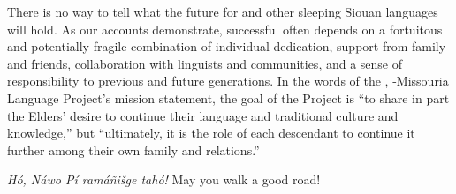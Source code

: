 \documentclass[output=paper]{LSP/langsci}
\begin{document}
There is no way to tell what the future for  and other sleeping Siouan languages will hold. As our accounts demonstrate, successful  often depends on a fortuitous and potentially fragile combination of individual dedication, support from family and friends, collaboration with linguists and communities, and a sense of responsibility to previous and future generations. In the words of the , -Missouria Language Project's mission statement, the goal of the Project is ``to share in part the Elders' desire to continue their language and traditional culture and knowledge,'' but ``ultimately, it is the role of each descendant to continue it further among their own family and relations.''

\emph{Hó, Náwo Pí ramáñišge tahó!}  May you walk a good road!

\printbibliography[heading=subbibliography,notkeyword=this]
\end{document}

